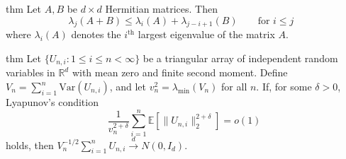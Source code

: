 \documentclass[11pt]{article}
\begin{document}
\begin{restatable}{thm}{}  \label{thm: weyl}
    Let $A, B$ be $d\times d$ Hermitian matrices. Then
    \[\lambda_j(A+B) \leq \lambda_i(A) + \lambda_{j - i+1}(B) \qquad \text{for $i\leq j$ }\]
    where $\lambda_i(A)$ denotes the $i^{\text{th}}$ largest eigenvalue of the matrix $A$. 
\end{restatable}

\begin{restatable}{thm}{} \label{thm: lyapunov clt}
    Let $\{U_{n, i}: 1 \leq i \leq n < \infty\}$ be a triangular array of independent random variables in $\mathbb{R}^d$ with mean zero and finite second moment. Define $V_n = \sum_{i= 1}^n \text{Var}(U_{n,i})$, and let $v_n^2 = \lambda_{\min}(V_n)$ for all $n$. If, for some $\delta > 0$, Lyapunov's condition
    \[\frac{1}{v_n^{2+\delta}}\sum_{i = 1}^n \mathbb{E}\left[\|U_{n, i}\|_2^{2+\delta}\right] = o(1)\]
    holds, then $V_n^{-1/2}\sum_{i = 1}^nU_{n, i} \overset{d}{\rightarrow} N(0, I_d)$.
\end{restatable}


\end{document}
